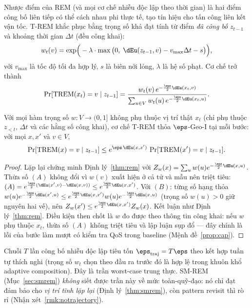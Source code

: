 Nhược điểm của REM (và mọi cơ chế nhiễu độc lập theo thời gian) là hai điểm công
bố liên tiếp có thể cách nhau phi thực tế, tạo tín hiệu cho tấn công liên kết
vận tốc. T-REM khắc phục bằng trọng số khả đạt tính từ điểm \emph{đã công bố}
$z_{t-1}$ và khoảng thời gian $\Delta t$ (đều công khai):
\[
w_t(v) = \exp\!\Big(-\lambda \cdot \max\big(0,\; \dEu(z_{t-1}, v) - v_{\max}\Delta t - s\big)\Big),
\]
với $v_{\max}$ là tốc độ tối đa hợp lý, $s$ là biên nới lỏng, $\lambda$ là hệ số
phạt. Cơ chế trở thành
\[
\Pr[\mathrm{TREM}(x_t) = v \mid z_{t-1}]
= \frac{w_t(v)\, e^{-\frac{\eps}{2}\dEu(x_t, v)}}
{\sum_{u \in V} w_t(u)\, e^{-\frac{\eps}{2}\dEu(x_t, u)}}.
\]

\begin{dinhly}
\label{thm:trem}
Với mọi hàm trọng số $w: V \to (0, 1]$ không phụ thuộc vị trí thật $x_t$ (chỉ
phụ thuộc $z_{<t}$, $\Delta t$ và các hằng số công khai), cơ chế T-REM thỏa
$\eps$-Geo-I tại mỗi bước: với mọi $x, x'$ và $v \in V$,
\[
\Pr[\mathrm{TREM}(x) = v \mid z_{t-1}] \le e^{\eps\,\dEu(x,x')}\,
\Pr[\mathrm{TREM}(x') = v \mid z_{t-1}].
\]
\end{dinhly}

\begin{proof}
Lặp lại chứng minh Định lý~\ref{thm:rem} với $Z_w(x) = \sum_u w(u)
e^{-\frac{\eps}{2}\dEu(x,u)}$. Thừa số $(A)$ không đổi vì $w(v)$ xuất hiện ở cả
tử và mẫu nên triệt tiêu:
$(A) = e^{\frac{\eps}{2}(\dEu(x',v)-\dEu(x,v))} \le e^{\frac{\eps}{2}\dEu(x,x')}$.
Với $(B)$: từng số hạng thỏa $w(u) e^{-\frac{\eps}{2}\dEu(x',u)} \le
e^{\frac{\eps}{2}\dEu(x,x')} w(u) e^{-\frac{\eps}{2}\dEu(x,u)}$ (trọng số $w(u)
> 0$ giữ nguyên hai vế), nên $Z_w(x') \le e^{\frac{\eps}{2}\dEu(x,x')} Z_w(x)$.
Kết luận như Định lý~\ref{thm:rem}. Điều kiện then chốt là $w$ đo được theo
thông tin công khai: nếu $w$ phụ thuộc $x_t$, thừa số $(A)$ không triệt tiêu và
lập luận sụp đổ --- đây chính là lỗi của bước làm mượt có kiểm tra QoS trong
baseline (Mệnh đề~\ref{prop:cap}).
\end{proof}

\begin{nhanxet}
Chuỗi $T$ lần công bố nhiễu độc lập tiêu tốn $\eps_{\mathrm{traj}} = T\eps$ theo
kết hợp tuần tự thích nghi (trọng số $w_t$ chọn theo đầu ra trước đó là hợp lệ
trong khuôn khổ adaptive composition). Đây là trần worst-case trung thực. SM-REM
(Mục~\ref{sec:smrem}) \emph{không} siết được trần này về mức toàn-quỹ-đạo: nó chỉ
đạt đảm bảo cho \emph{vị trí tĩnh lặp lại} (Định lý~\ref{thm:smrem}), còn pattern
revisit thì rò rỉ (Nhận xét~\ref{rmk:notrajectory}).
\end{nhanxet}

